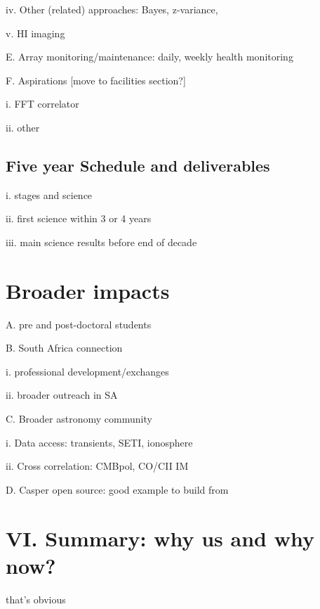 \documentclass[preprint]{aastex}
\begin{document}
iv. Other (related) approaches: Bayes, z-variance,

v. HI imaging

E. Array monitoring/maintenance: daily, weekly health monitoring

F. Aspirations [move to facilities section?]

i. FFT correlator

ii. other

\subsection{Five year Schedule and deliverables} %

i. stages and science

ii. first science within 3 or 4 years

iii. main science results before end of decade


\section{Broader impacts} %

A. pre and post-doctoral students

B. South Africa connection

i. professional development/exchanges

ii. broader outreach in SA

C. Broader astronomy community

i. Data access: transients, SETI, ionosphere

ii. Cross correlation: CMBpol, CO/CII IM

D. Casper open source: good example to build from


\section{VI. Summary: why us and why now?} %

that's obvious


\clearpage
\setcounter{page}{1}
\thispagestyle{empty}
%
%


\end{document}
